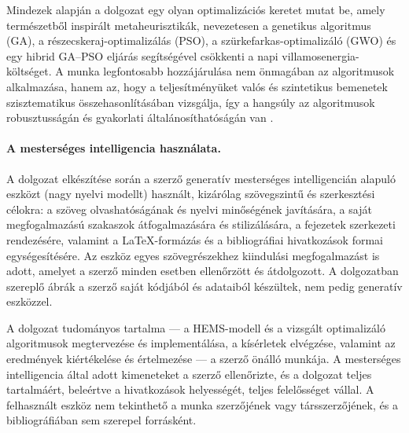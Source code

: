 Mindezek alapján a dolgozat egy olyan optimalizációs keretet mutat be, amely természetből inspirált metaheurisztikák, nevezetesen a genetikus algoritmus (GA), a részecskeraj-optimalizálás (PSO), a szürkefarkas-optimalizáló (GWO) és egy hibrid GA--PSO eljárás segítségével csökkenti a napi villamosenergia-költséget. A munka legfontosabb hozzájárulása nem önmagában az algoritmusok alkalmazása, hanem az, hogy a teljesítményüket valós és szintetikus bemenetek szisztematikus összehasonlításában vizsgálja, így a hangsúly az algoritmusok robusztusságán és gyakorlati általánosíthatóságán van \cite{Lazzari2023}.

\paragraph{A mesterséges intelligencia használata.}
A dolgozat elkészítése során a szerző generatív mesterséges intelligencián alapuló eszközt (nagy nyelvi modellt) használt, kizárólag szövegszintű és szerkesztési célokra: a szöveg olvashatóságának és nyelvi minőségének javítására, a saját megfogalmazású szakaszok átfogalmazására és stilizálására, a fejezetek szerkezeti rendezésére, valamint a \LaTeX-formázás és a bibliográfiai hivatkozások formai egységesítésére. Az eszköz egyes szövegrészekhez kiindulási megfogalmazást is adott, amelyet a szerző minden esetben ellenőrzött és átdolgozott. A dolgozatban szereplő ábrák a szerző saját kódjából és adataiból készültek, nem pedig generatív eszközzel.

A dolgozat tudományos tartalma --- a HEMS-modell és a vizsgált optimalizáló algoritmusok megtervezése és implementálása, a kísérletek elvégzése, valamint az eredmények kiértékelése és értelmezése --- a szerző önálló munkája. A mesterséges intelligencia által adott kimeneteket a szerző ellenőrizte, és a dolgozat teljes tartalmáért, beleértve a hivatkozások helyességét, teljes felelősséget vállal. A felhasznált eszköz nem tekinthető a munka szerzőjének vagy társszerzőjének, és a bibliográfiában sem szerepel forrásként.
